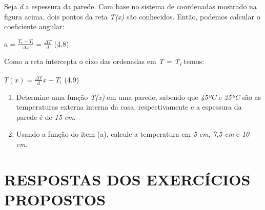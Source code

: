 Seja \textit{d} a espessura da parede. Com base no sistema de coordenadas mostrado na figura acima, dois pontos da reta \textit{T(x)} são conhecidos. Então, podemos calcular o coeficiente angular: 

\begin{FlushRight}
 \( a=\frac{T_{e}-T_{i}}{ \Delta x}=\frac{ \Delta T}{d} \) \tab (4.8)
\end{FlushRight}

Como a reta intercepta o eixo das ordenadas em \textit{T = T\textsubscript{i}}  temos:

\begin{FlushRight}
 \( T \left( x \right) =\frac{ \Delta T}{d}x+T_{i} \) \tab (4.9)
\end{FlushRight}

\begin{enumerate}
	\item Determine uma função  \textit{T(x) }em uma parede, sabendo que \textit{45ºC } e \textit{25ºC} são as temperaturas externa interna da casa, respectivamente e a espessura da parede é de \textit{15 cm}.

	\item Usando a função do item (a), calcule a temperatura em \textit{5} \textit{cm}, \textit{7,5} \textit{cm} e \textit{10 cm}.
\end{enumerate}

\section{RESPOSTAS DOS EXERCÍCIOS PROPOSTOS}

